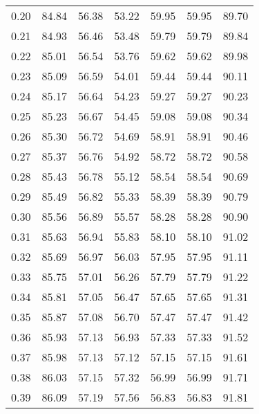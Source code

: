 \begin{tabular}{|c|c|c|c|c|c|c|}
      0.20 &     84.84 &     56.38 &      53.22 &   59.95 &      59.95 &         89.70 \\
      0.21 &     84.93 &     56.46 &      53.48 &   59.79 &      59.79 &         89.84 \\
      0.22 &     85.01 &     56.54 &      53.76 &   59.62 &      59.62 &         89.98 \\
      0.23 &     85.09 &     56.59 &      54.01 &   59.44 &      59.44 &         90.11 \\
      0.24 &     85.17 &     56.64 &      54.23 &   59.27 &      59.27 &         90.23 \\
      0.25 &     85.23 &     56.67 &      54.45 &   59.08 &      59.08 &         90.34 \\
      0.26 &     85.30 &     56.72 &      54.69 &   58.91 &      58.91 &         90.46 \\
      0.27 &     85.37 &     56.76 &      54.92 &   58.72 &      58.72 &         90.58 \\
      0.28 &     85.43 &     56.78 &      55.12 &   58.54 &      58.54 &         90.69 \\
      0.29 &     85.49 &     56.82 &      55.33 &   58.39 &      58.39 &         90.79 \\
      0.30 &     85.56 &     56.89 &      55.57 &   58.28 &      58.28 &         90.90 \\
      0.31 &     85.63 &     56.94 &      55.83 &   58.10 &      58.10 &         91.02 \\
      0.32 &     85.69 &     56.97 &      56.03 &   57.95 &      57.95 &         91.11 \\
      0.33 &     85.75 &     57.01 &      56.26 &   57.79 &      57.79 &         91.22 \\
      0.34 &     85.81 &     57.05 &      56.47 &   57.65 &      57.65 &         91.31 \\
      0.35 &     85.87 &     57.08 &      56.70 &   57.47 &      57.47 &         91.42 \\
      0.36 &     85.93 &     57.13 &      56.93 &   57.33 &      57.33 &         91.52 \\
      0.37 &     85.98 &     57.13 &      57.12 &   57.15 &      57.15 &         91.61 \\
      0.38 &     86.03 &     57.15 &      57.32 &   56.99 &      56.99 &         91.71 \\
      0.39 &     86.09 &     57.19 &      57.56 &   56.83 &      56.83 &         91.81 \\

\end{tabular}

